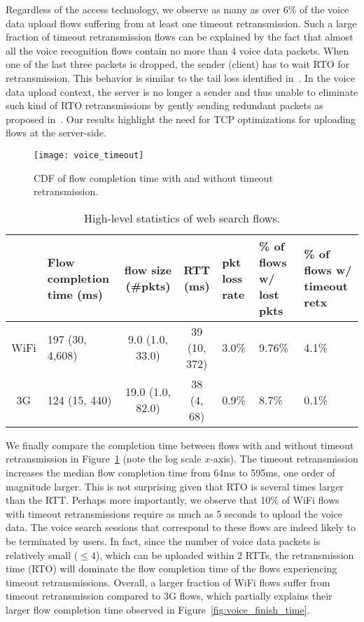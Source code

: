 Regardless of the access technology, we observe as many as over 6\% of the voice data upload flows suffering from at least one timeout retransmission. Such a large fraction of timeout retransmission flows can be explained by the fact that almost all the voice recognition flows contain no more than 4 voice data packets. When one of the last three packets is dropped, the sender (\ie client) has to wait RTO for retransmission. This behavior is similar to the tail loss identified in~\cite{flach2013reducing}. In the voice data upload context, the server is no longer a sender and thus unable to eliminate such kind of RTO retransmissions by gently sending redundant packets as proposed in~\cite{flach2013reducing}. Our results highlight the need for TCP optimizations for uploading flows at the server-side. 

\begin{figure}[th]
\centering
	\texttt{[image: voice\_timeout]}
\caption{CDF of flow completion time with and without timeout retransmission.}
\label{fig:voice_rto}
\minsqueeze
\end{figure}

\begin{table*}[t]
\caption{High-level statistics of web search flows.}
\label{tab:web_stats}
\centering
\renewcommand{\arraystretch}{1.0}
\begin{tabular}{c|C{2.6cm}|c|c|C{1.2cm}|C{1.85cm}|C{2.1cm}}
	\hline
	& {Flow completion time (ms)} & {flow size (\#pkts)} & {RTT (ms)} & pkt loss rate & \% of flows w/ lost pkts & \% of flows w/ timeout retx \\
	\hline
	WiFi & 197 (30, 4,608) & 9.0 (1.0, 33.0) & 39 (10, 372) & 3.0\% & 9.76\% & 4.1\% \\
	\hline
	3G & 124 (15, 440) & 19.0 (1.0, 82.0) & 38 (4, 68) & 0.9\% & 8.7\% & 0.1\% \\
	\hline
\end{tabular}
\minsqueeze
\end{table*}

We finally compare the completion time between flows with and without timeout retransmission in Figure~\ref{fig:voice_rto} (note the log scale $x$-axis). The timeout retransmission increases the median flow completion time from 64ms to 595ms, \ie one order of magnitude larger. This is not surprising given that RTO is several times larger than the RTT. Perhaps more importantly, we observe that 10\% of WiFi flows with timeout retransmissions require as much as 5 seconds to upload the voice data. The voice search sessions that correspond to these flows are indeed likely to be terminated by users. In fact, since the number of voice data packets is relatively small ($\le 4$), which can be uploaded within 2 RTTs, the retransmission time (\ie RTO) will dominate the flow completion time of the flows experiencing timeout retransmissions.  Overall, a larger fraction of WiFi flows suffer from timeout retransmission compared to 3G flows, which partially explains their larger flow completion time observed in Figure~\ref{fig:voice_finish_time}.

